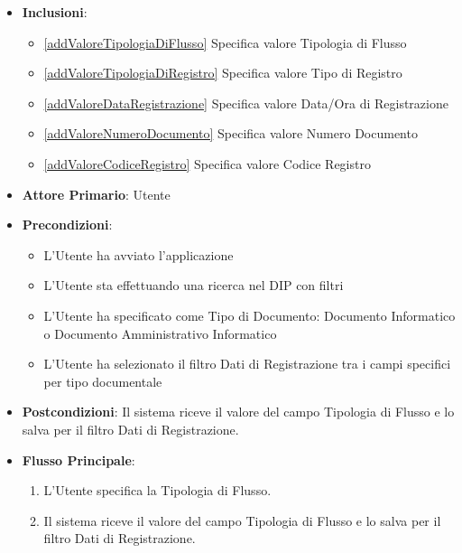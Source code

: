 \begin{itemize}
\begin{enumerate}
            \item Il sistema imposta i valori del filtro come parametri per la ricerca
      \end{enumerate}
      \item \textbf{Inclusioni}:
      \begin{itemize}
            \item \ref{addValoreTipologiaDiFlusso} Specifica valore Tipologia di Flusso
            \item \ref{addValoreTipologiaDiRegistro} Specifica valore Tipo di Registro
            \item \ref{addValoreDataRegistrazione} Specifica valore Data/Ora di Registrazione
            \item \ref{addValoreNumeroDocumento} Specifica valore Numero Documento
            \item \ref{addValoreCodiceRegistro} Specifica valore Codice Registro
      \end{itemize}
\end{itemize}


\label{compilaValoreFiltroTipologiaDiFlusso}
\begin{itemize}
      \item \textbf{Attore Primario}: Utente
      \item \textbf{Precondizioni}: 
      \begin{itemize}            
            \item L'Utente ha avviato l'applicazione
            \item L'Utente sta effettuando una ricerca nel DIP con filtri
            \item L'Utente ha specificato come Tipo di Documento: Documento Informatico o Documento Amministrativo Informatico
            \item L'Utente ha selezionato il filtro Dati di Registrazione tra i campi specifici per tipo documentale
      \end{itemize}
      \item \textbf{Postcondizioni}: Il sistema riceve il valore del campo Tipologia di Flusso e lo salva per il filtro Dati di Registrazione.
      \item \textbf{Flusso Principale}:
      \begin{enumerate}
            \item L'Utente specifica la Tipologia di Flusso.
            \item Il sistema riceve il valore del campo Tipologia di Flusso e lo salva per il filtro Dati di Registrazione.
      \end{enumerate}
\end{itemize}

